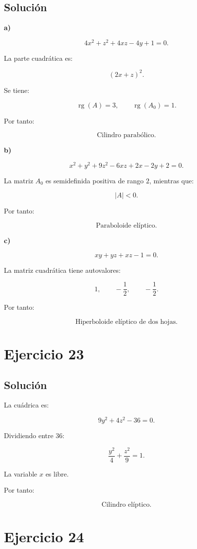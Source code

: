 \documentclass[11pt,a4paper]{article}
\newcommand{\rg}{\operatorname{rg}}
\begin{document}
\subsection{Solución}

\textbf{a)}

\[
4x^2+z^2+4xz-4y+1=0.
\]

La parte cuadrática es:

\[
(2x+z)^2.
\]

Se tiene:

\[
\rg(A)=3,
\qquad
\rg(A_0)=1.
\]

Por tanto:

\[
\boxed{\text{Cilindro parabólico}.}
\]

\textbf{b)}

\[
x^2+y^2+9z^2-6xz+2x-2y+2=0.
\]

La matriz \(A_0\) es semidefinida positiva de rango \(2\), mientras que:

\[
|A|<0.
\]

Por tanto:

\[
\boxed{\text{Paraboloide elíptico}.}
\]

\textbf{c)}

\[
xy+yz+xz-1=0.
\]

La matriz cuadrática tiene autovalores:

\[
1,
\qquad
-\frac12,
\qquad
-\frac12.
\]

Por tanto:

\[
\boxed{\text{Hiperboloide elíptico de dos hojas}.}
\]

\section{Ejercicio 23}
\subsection{Solución}

La cuádrica es:

\[
9y^2+4z^2-36=0.
\]

Dividiendo entre \(36\):

\[
\boxed{
\frac{y^2}{4}
+
\frac{z^2}{9}
=
1.
}
\]

La variable \(x\) es libre.

Por tanto:

\[
\boxed{\text{Cilindro elíptico}.}
\]

\section{Ejercicio 24}
\end{document}
